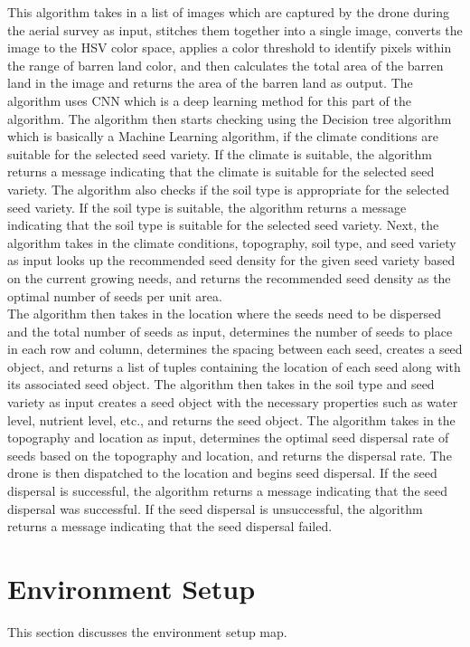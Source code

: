 \documentclass[conference]{IEEEtran}
\begin{document}
 This algorithm takes in a list of images which are captured by the drone during the aerial survey as input, stitches them together into a single image, converts the image to the HSV color space, applies a color threshold to identify pixels within the range of barren land color, and then calculates the total area of the barren land in the image and returns the area of the barren land as output. The algorithm uses CNN which is a deep learning method for this part of the algorithm. 
 The algorithm then starts checking using the Decision tree algorithm which is basically a Machine Learning algorithm, if the climate conditions are suitable for the selected seed variety. If the climate is suitable, the algorithm returns a message indicating that the climate is suitable for the selected seed variety. The algorithm also checks if the soil type is appropriate for the selected seed variety. If the soil type is suitable, the algorithm returns a message indicating that the soil type is suitable for the selected seed variety. Next, the algorithm takes in the climate conditions, topography, soil type, and seed variety as input looks up the recommended seed density for the given seed variety based on the current growing needs, and returns the recommended seed density as the optimal number of seeds per unit area. 
\\The algorithm then takes in the location where the seeds need to be dispersed and the total number of seeds as input, determines the number of seeds to place in each row and column, determines the spacing between each seed, creates a seed object, and returns a list of tuples containing the location of each seed along with its associated seed object. The algorithm then takes in the soil type and seed variety as input creates a seed object with the necessary properties such as water level, nutrient level, etc., and returns the seed object. The algorithm takes in the topography and location as input, determines the optimal seed dispersal rate of seeds based on the topography and location, and returns the dispersal rate. The drone is then dispatched to the location and begins seed dispersal. If the seed dispersal is successful, the algorithm returns a message indicating that the seed dispersal was successful. If the seed dispersal is unsuccessful, the algorithm returns a message indicating that the seed dispersal failed.

\section{Environment Setup}
This section discusses the environment setup map.
\end{document}
